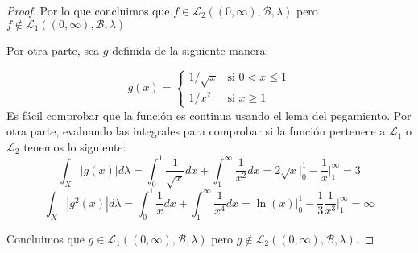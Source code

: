 \documentclass[letter,twoside,12pt]{article}
\numberwithin{equation}{section}
\begin{document}
\begin{enumerate}[label = (\textbf{\arabic*.})]
\begin{proof}
Por lo que concluimos que $ f \in \mathcal{L}_2((0, \infty), \mathcal{B}, \lambda) $ pero $ f \not \in \mathcal{L}_1((0, \infty), \mathcal{B}, \lambda) $

Por otra parte, sea $g$ definida de la siguiente manera:

\begin{equation}
g(x) = \left\{
	\begin{array}{ll}
		1/\sqrt{x}  & \mbox{si } 0 < x \leq 1 
		 \\ 1/x^2 & \mbox{si } x \geq 1
	\end{array}
\right.
\end{equation}
Es fácil comprobar que la función es continua usando el lema del pegamiento. Por otra parte, evaluando las integrales para comprobar si la función pertenece a $ \mathcal{L}_1 $ o $ \mathcal{L}_2 $ tenemos lo siguiente:
\begin{equation}
\int_X |g(x)|d\lambda = \int_{0}^1 \frac{1}{\sqrt{x}}dx + \int_{1}^\infty \frac{1}{x^2}dx =  2\sqrt{x}\Big|_0^1  -\frac{1}{x}\Big|_1^\infty = 3
\end{equation}
\begin{equation}
\int_X |g^2(x)|d\lambda = \int_{0}^1 \frac{1}{x}dx + \int_{1}^\infty \frac{1}{x^4}dx =  \ln(x)\Big|_0^1  -\frac{1}{3}\frac{1}{x^3}\Big|_1^\infty = \infty
\end{equation}

Concluimos que $ g \in \mathcal{L}_1((0, \infty), \mathcal{B}, \lambda)$ pero  $g \not \in \mathcal{L}_2((0, \infty), \mathcal{B}, \lambda) $.
 
\end{proof}
\end{enumerate}
\end{document}
